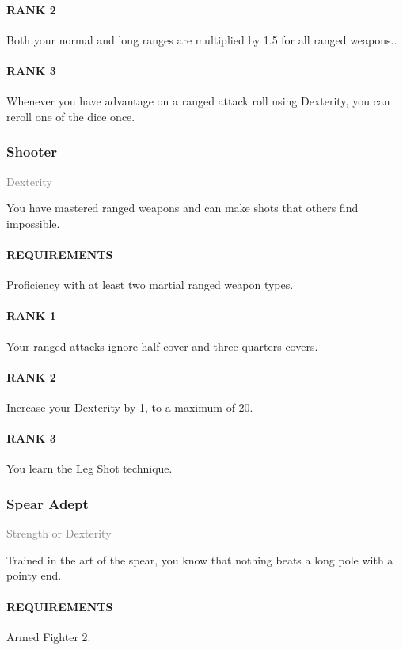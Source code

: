 \paragraph{RANK 2} Both your normal and long ranges are multiplied by 1.5 for all ranged weapons..
\paragraph{RANK 3} Whenever you have advantage on a ranged attack roll using Dexterity, you can reroll one of the dice once.

\subsubsection{Shooter} \label{feat::shooter}
\small{\textcolor{gray}{Dexterity}}

\normalsize
You have mastered ranged weapons and can make shots that others find impossible.
\paragraph{REQUIREMENTS} Proficiency with at least two martial ranged weapon types.
\paragraph{RANK 1} Your ranged attacks ignore half cover and three-quarters covers.
\paragraph{RANK 2} Increase your Dexterity by 1, to a maximum of 20.
\paragraph{RANK 3} You learn the Leg Shot technique.

\subsubsection{Spear Adept} \label{feat::spearadept}
\small{\textcolor{gray}{Strength or Dexterity}}

\normalsize
Trained in the art of the spear, you know that nothing beats a long pole with a pointy end.
\paragraph{REQUIREMENTS} Armed Fighter 2.

